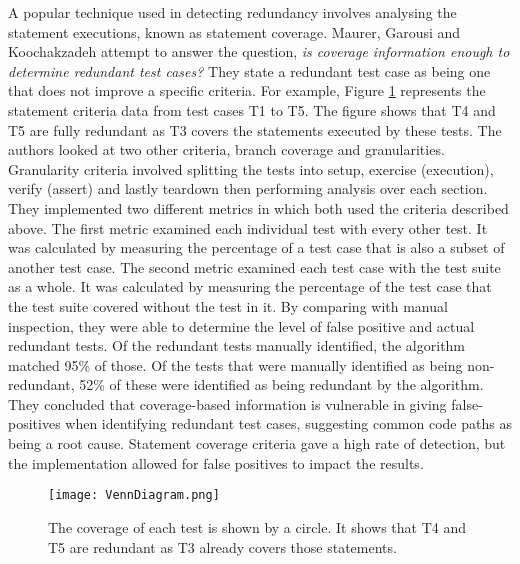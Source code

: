 A popular technique used in detecting redundancy involves analysing the statement executions, known as statement coverage. Maurer, Garousi and Koochakzadeh \cite{koochakzadeh2009test} attempt to answer the question, \textit{is coverage information enough to determine redundant test cases?} They state a redundant test case as being one that does not improve a specific criteria. For example, Figure \ref{fig:venndiagram} represents the statement criteria data from test cases T1 to T5. The figure shows that T4 and T5 are fully redundant as T3 covers the statements executed by these tests. The authors looked at two other criteria, branch coverage and granularities. Granularity criteria involved splitting the tests into setup, exercise (execution), verify (assert) and lastly teardown then performing analysis over each section. They implemented two different metrics in which both used the criteria described above. The first metric examined each individual test with every other test. It was calculated by measuring the percentage of a test case that is also a subset of another test case. The second metric examined each test case with the test suite as a whole. It was calculated by measuring the percentage of the test case that the test suite covered without the test in it. By comparing with manual inspection, they were able to determine the level of false positive and actual redundant tests. Of the redundant tests manually identified, the algorithm matched 95\% of those. Of the tests that were manually identified as being non-redundant, 52\% of these were identified as being redundant by the algorithm. They concluded that coverage-based information is vulnerable in giving false-positives when identifying redundant test cases, suggesting common code paths as being a root cause. Statement coverage criteria gave a high rate of detection, but the implementation allowed for false positives to impact the results. 

\begin{figure}[h]
\begin{center}
\texttt{[image: VennDiagram.png]}
\end{center}
\caption{The coverage of each test is shown by a circle. It shows that T4 and T5 are redundant as T3 already covers those statements.}
\label{fig:venndiagram}
\end{figure}

